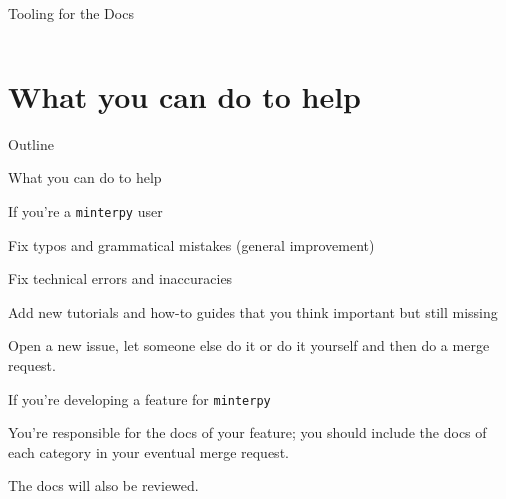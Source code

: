 \documentclass[english,aspectratio=169]{beamer}
\let\tempone\itemize
\let\temptwo\enditemize
\renewenvironment{itemize}{\tempone\addtolength{\itemsep}{0.35\baselineskip}}{\temptwo}
\begin{document}
\begin{frame}{Tooling for the Docs}
\begin{columns}[onlytextwidth]
\end{columns}

\end{frame}

\section{What you can do to help}

\begin{frame}{Outline}
\tableofcontents[currentsection]
\end{frame}
    
\begin{frame}{What you can do to help}
\footnotesize

\begin{block}{If you're a \texttt{minterpy} user}
\begin{itemize}
    \item Fix typos and grammatical mistakes (general improvement)
    \item Fix technical errors and inaccuracies
    \item Add new tutorials and how-to guides that you think important but still missing
\end{itemize}

\vspace{0.25em}

Open a new issue, let someone else do it or do it yourself and then do a merge request.
\end{block}

\begin{block}{If you're developing a feature for \texttt{minterpy}}

You're responsible for the docs of your feature;
you should include the docs of each category in your eventual merge request.

\vspace{0.5em}

The docs will also be reviewed.
\end{block}

\end{frame}
\end{document}
